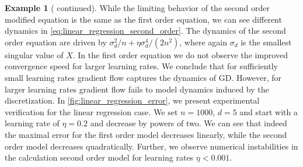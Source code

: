 \documentclass[12pt]{article}
\theoremstyle{definition}
\newtheorem{example}[example]{Example}
\numberwithin{equation}{section}
\newcommand{\T}{\mathsf{T}}
\newcommand{\norm}[1]{\lVert{#1}\rVert_2}
\newcommand{\defeq}{\vcentcolon=}
\DeclareMathOperator{\diag}{diag}
\begin{document}
\begin{example}[ continued]
  While the limiting behavior of the second order modified equation is the same as the first order equation, we can see different dynamics in \eqref{eq:linear_regression_second_order}. The dynamics of the second order equation are driven by $\sigma_d^2/n + \eta\sigma_d^4/(2n^2)$, where again $\sigma_d$ is the smallest singular value of $X$. In the first order equation we do not observe the improved convergence speed for larger learning rates.
  We conclude that for sufficiently small learning rates gradient flow captures the dynamics of GD. However, for larger learning rates gradient flow fails to model dynamics induced by the discretization. In \autoref{fig:linear_regression_error}, we present experimental verification for the linear regression case. We set $n = 1000$, $d = 5$ and start with a learning rate of $\eta = 0.2$ and decrease by powers of two. We can see that indeed the maximal error for the first order model decreases linearly, while the second order model decreases quadratically. Further, we observe numerical instabilities in the calculation second order model for learning rates $\eta < 0.001$.


\end{example}
\end{document}
